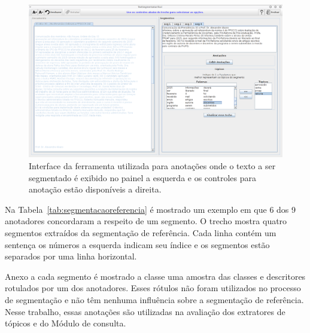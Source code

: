   \begin{figure}[!h]
	  \centering
	  \includegraphics[width=1\textwidth]{conteudo/capitulos/figs/interface-anotacoes.png}
	  \caption{Interface da ferramenta utilizada para anotações onde o texto a ser segmentado é exibido no painel a esquerda e os controles para anotação estão disponíveis a direita.}
	  \label{fig:interfaceanotacoes}
  \end{figure}





Na Tabela~\ref{tab:segmentacaoreferencia} é mostrado um exemplo em que 6 dos 9 anotadores concordaram a respeito de um segmento. O trecho mostra quatro segmentos extraídos da segmentação de referência. 
Cada linha contém um sentença os números a esquerda indicam seu índice e os segmentos estão separados por uma linha horizontal.

Anexo a cada segmento é mostrado a classe uma amostra das classes e descritores rotulados por um dos anotadores. Esses rótulos não foram utilizados no processo de segmentação e não têm nenhuma influência sobre a segmentação de referência. Nesse trabalho, essas anotações são utilizadas na avaliação dos extratores de tópicos e do Módulo de consulta.

